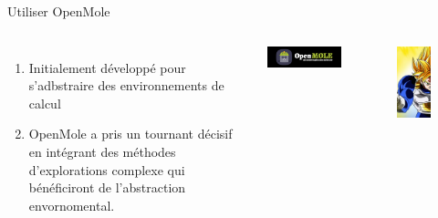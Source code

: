 \documentclass[newPxFont]{beamer}
\begin{document}
\begin{frame}[c]{Utiliser OpenMole}
  \vspace{-1cm}
  \begin{columns}[onlytextwidth,T]
    \column{\dimexpr\linewidth-30mm-5mm}
    \begin{enumerate}
        \item Initialement développé pour s'adbstraire des environnements de calcul
        \item OpenMole a pris un tournant décisif en intégrant des méthodes d'explorations complexe qui bénéficiront de l'abstraction envornomental.
    \end{enumerate}
    
    \includegraphics[width=7.5cm]{img/OpenMOLE-Banner}
    \column{30mm}
    \begin{figure}
      \includegraphics[width=3.4cm]{img/dragonBall.png}
    \end{figure}
  \end{columns}
\end{frame}
\end{document}

